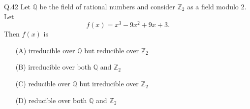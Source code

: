 \documentclass{article}
\begin{document}
																																							       Q.42 \quad Let $\mathbb{Q}$ be the field of rational numbers and consider $\mathbb{Z}_2$ as a field modulo 2. Let
																																							           \[
																																								       f(x) = x^3 - 9x^2 + 9x + 3.
																																								           \]
																																									       Then $f(x)$ is
																																									           \begin{itemize}
																																										           
																																											           \item[(A)] irreducible over $\mathbb{Q}$ but reducible over $\mathbb{Z}_2$
																																												           \item[(B)] irreducible over both $\mathbb{Q}$ and $\mathbb{Z}_2$
																																													           \item[(C)] reducible over $\mathbb{Q}$ but irreducible over $\mathbb{Z}_2$
																																														           \item[(D)] reducible over both $\mathbb{Q}$ and $\mathbb{Z}_2$
																																															       \end{itemize}
																																															        \vspace{0.5em}
\end{document}
